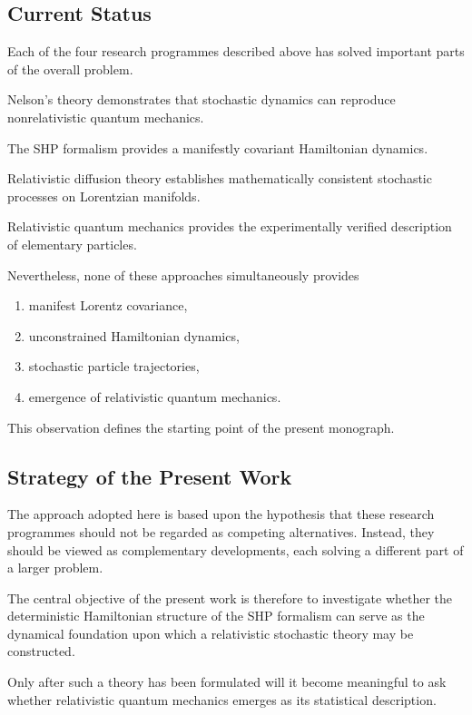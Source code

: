 \subsection{Current Status}
Each of the four research programmes described above has solved
important parts of the overall problem.

Nelson's theory demonstrates that stochastic dynamics can reproduce
nonrelativistic quantum mechanics.

The SHP formalism provides a manifestly covariant Hamiltonian dynamics.

Relativistic diffusion theory establishes mathematically consistent
stochastic processes on Lorentzian manifolds.

Relativistic quantum mechanics provides the experimentally verified
description of elementary particles.

Nevertheless, none of these approaches simultaneously provides
\begin{enumerate}
\item manifest Lorentz covariance,
\item unconstrained Hamiltonian dynamics,
\item stochastic particle trajectories,
\item emergence of relativistic quantum mechanics.
\end{enumerate}
This observation defines the starting point of the present monograph.
\subsection{Strategy of the Present Work}
The approach adopted here is based upon the hypothesis that these
research programmes should not be regarded as competing alternatives.
Instead, they should be viewed as complementary developments, each
solving a different part of a larger problem.

The central objective of the present work is therefore to investigate
whether the deterministic Hamiltonian structure of the SHP formalism can
serve as the dynamical foundation upon which a relativistic stochastic
theory may be constructed.

Only after such a theory has been formulated will it become meaningful
to ask whether relativistic quantum mechanics emerges as its statistical
description.

